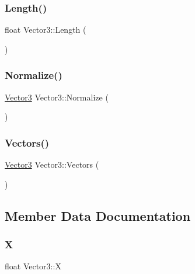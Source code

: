 \subsubsection{\texorpdfstring{Length()}{Length()}}
{\footnotesize\ttfamily float Vector3\+::\+Length (\begin{DoxyParamCaption}{ }\end{DoxyParamCaption})}

\mbox{\label{classVector3_a8a8cb236aae8602af246f4f56495f159}} 
\subsubsection{\texorpdfstring{Normalize()}{Normalize()}}
{\footnotesize\ttfamily \mbox{\hyperlink{classVector3}{Vector3}} Vector3\+::\+Normalize (\begin{DoxyParamCaption}{ }\end{DoxyParamCaption})}

\mbox{\label{classVector3_a49f4cb08ee79bc184e46101133f5ba4b}} 
\subsubsection{\texorpdfstring{Vectors()}{Vectors()}}
{\footnotesize\ttfamily \mbox{\hyperlink{classVector3}{Vector3}} Vector3\+::\+Vectors (\begin{DoxyParamCaption}{ }\end{DoxyParamCaption})}



\subsection{Member Data Documentation}
\mbox{\label{classVector3_a37198537fb3a99b029e12632a1632b00}} 
\subsubsection{\texorpdfstring{X}{X}}
{\footnotesize\ttfamily float Vector3\+::X}

\mbox{\label{classVector3_a946530ae3177de1a94c10f0ffece365b}} 
